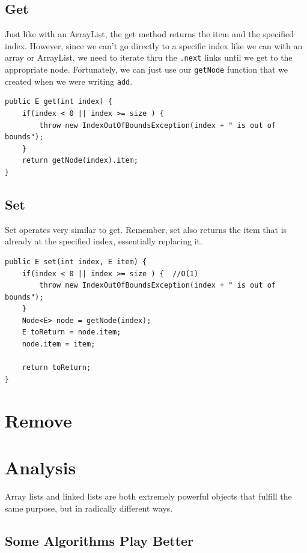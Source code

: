 \documentclass[10pt,a4paper]{book}
\begin{document}
\subsection{Get}
Just like with an ArrayList, the get method returns the item and the specified index.  
However, since we can't go directly to a specific index like we can with an array or ArrayList, we need to iterate thru the \texttt{.next} links until we get to the appropriate node.
Fortunately, we can just use our \texttt{getNode} function that we created when we were writing \texttt{add}.

 

\begin{verbatim}
public E get(int index) {
	if(index < 0 || index >= size ) { 
		throw new IndexOutOfBoundsException(index + " is out of bounds");
	}
	return getNode(index).item;
}
\end{verbatim}


\subsection{Set}

Set operates very similar to get.  Remember, set also returns the item that is already at the specified index, essentially replacing it.

\begin{verbatim}
public E set(int index, E item) {
	if(index < 0 || index >= size ) {  //O(1)
		throw new IndexOutOfBoundsException(index + " is out of bounds");
	}
	Node<E> node = getNode(index);
	E toReturn = node.item;
	node.item = item;
	
	return toReturn;
}
\end{verbatim}


\section{Remove}




\section{Analysis}
Array lists and linked lists are both extremely powerful objects that fulfill  the same purpose, but in radically different ways. 




\subsection{Some Algorithms Play Better}
\end{document}
